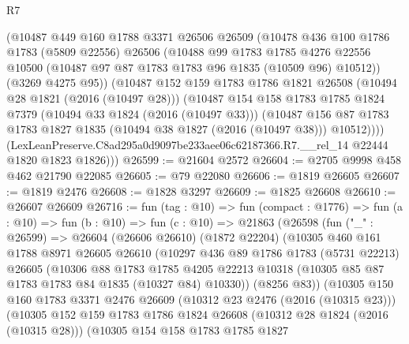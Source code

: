 \begin{lexlean}{R7}
\begin{coremodule}
        (@10487
          @449
          @160
          @1788
          @3371
          @26506
          @26509
          (@10478
            @436
            @100
            @1786
            @1783
            (@5809 @22556)
            @26506
            (@10488
              @99
              @1783
              @1785
              @4276
              @22556
              @10500
              (@10487 @97 @87 @1783 @1783 @96 @1835 (@10509 @96) @10512))
            (@3269 @4275 @95))
          (@10487
            @152
            @159
            @1783
            @1786
            @1821
            @26508
            (@10494 @28 @1821 (@2016 (@10497 @28)))
            (@10487
              @154
              @158
              @1783
              @1785
              @1824
              @7379
              (@10494 @33 @1824 (@2016 (@10497 @33)))
              (@10487
                @156
                @87
                @1783
                @1783
                @1827
                @1835
                (@10494 @38 @1827 (@2016 (@10497 @38)))
                @10512))))
        (LexLeanPreserve.C8ad295a0d9097be233aee06c62187366.R7.__rel_14 @22444 @1820 @1823 @1826)))
@26599 := @21604 @2572
@26604 := @2705 @9998 @458 @462 @21790 @22085
@26605 := @79 @22080
@26606 := @1819 @26605
@26607 := @1819 @2476
@26608 := @1828 @3297
@26609 := @1825 @26608
@26610 := @26607 @26609
@26716 := fun (tag : @10) =>
  fun (compact : @1776) =>
  fun (a : @10) =>
  fun (b : @10) =>
  fun (c : @10) =>
  @21863
    (@26598
      (fun ("_" : @26599) =>
      @26604
        (@26606 @26610)
        (@1872 @22204)
        (@10305
          @460
          @161
          @1788
          @8971
          @26605
          @26610
          (@10297
            @436
            @89
            @1786
            @1783
            (@5731 @22213)
            @26605
            (@10306
              @88
              @1783
              @1785
              @4205
              @22213
              @10318
              (@10305 @85 @87 @1783 @1783 @84 @1835 (@10327 @84) @10330))
            (@8256 @83))
          (@10305
            @150
            @160
            @1783
            @3371
            @2476
            @26609
            (@10312 @23 @2476 (@2016 (@10315 @23)))
            (@10305
              @152
              @159
              @1783
              @1786
              @1824
              @26608
              (@10312 @28 @1824 (@2016 (@10315 @28)))
              (@10305
                @154
                @158
                @1783
                @1785
                @1827

\end{coremodule}
\end{lexlean}

